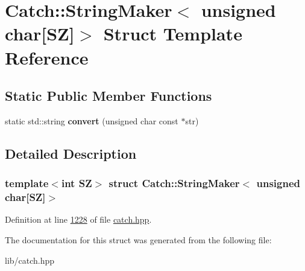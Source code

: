 \hypertarget{structCatch_1_1StringMaker_3_01unsigned_01char[SZ]_4}{}\section{Catch\+::String\+Maker$<$ unsigned char\mbox{[}SZ\mbox{]}$>$ Struct Template Reference}
\label{structCatch_1_1StringMaker_3_01unsigned_01char[SZ]_4}
\subsection*{Static Public Member Functions}
\begin{DoxyCompactItemize}
\item 
\mbox{\label{structCatch_1_1StringMaker_3_01unsigned_01char[SZ]_4_a590d64c72b0cc75c113f1eea95d52b66}} 
static std\+::string {\bfseries convert} (unsigned char const $\ast$str)
\end{DoxyCompactItemize}


\subsection{Detailed Description}
\subsubsection*{template$<$int SZ$>$\newline
struct Catch\+::\+String\+Maker$<$ unsigned char\mbox{[}\+S\+Z\mbox{]}$>$}



Definition at line \mbox{\hyperlink{catch_8hpp_source_l01228}{1228}} of file \mbox{\hyperlink{catch_8hpp_source}{catch.\+hpp}}.



The documentation for this struct was generated from the following file\+:\begin{DoxyCompactItemize}
\item 
lib/catch.\+hpp\end{DoxyCompactItemize}
